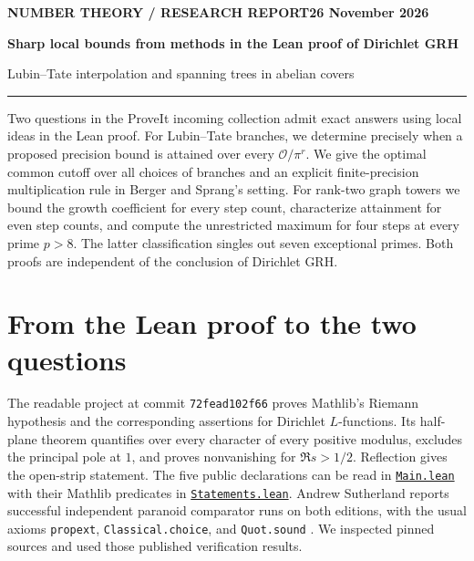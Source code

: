 \documentclass[11pt,letterpaper]{article}
\theoremstyle{definition}\newtheorem{example}[theorem]{Example}
\newcommand{\OO}{\mathcal O}\newcommand{\FF}{\mathbb F}\newcommand{\ZZ}{\mathbb Z}\newcommand{\QQ}{\mathbb Q}
\newcommand{\src}[2]{\href{https://github.com/lsernau/grh-lean/blob/72fead102f663d5c7a407964a13dc0cf9d977207/grh/src/#1}{#2}}
\numberwithin{equation}{section}
\begin{document}
\thispagestyle{plain}
{\small\bfseries\textcolor{accent}{NUMBER THEORY \enspace / \enspace RESEARCH REPORT}\hfill 26 November 2026\par}
\vspace{10pt}
{\LARGE\bfseries\color{inkblue} Sharp local bounds from methods in the Lean proof of Dirichlet GRH\par}
\vspace{4pt}
{\large Lubin--Tate interpolation and spanning trees in abelian covers\par}
\vspace{9pt}\hrule\vspace{10pt}
\noindent Two questions in the ProveIt incoming collection admit exact answers using local ideas in the Lean proof. For Lubin--Tate branches, we determine precisely when a proposed precision bound is attained over every $\OO/\pi^r$. We give the optimal common cutoff over all choices of branches and an explicit finite-precision multiplication rule in Berger and Sprang's setting. For rank-two graph towers we bound the growth coefficient for every step count, characterize attainment for even step counts, and compute the unrestricted maximum for four steps at every prime $p>8$. The latter classification singles out seven exceptional primes. Both proofs are independent of the conclusion of Dirichlet GRH.

\section{From the Lean proof to the two questions}
The readable project at commit \texttt{72fead102f66} proves Mathlib's Riemann hypothesis and the corresponding assertions for Dirichlet $L$-functions. Its half-plane theorem quantifies over every character of every positive modulus, excludes the principal pole at $1$, and proves nonvanishing for $\Re s>1/2$. Reflection gives the open-strip statement. The five public declarations can be read in \src{Main.lean}{\texttt{Main.lean}} with their Mathlib predicates in \src{Statements.lean}{\texttt{Statements.lean}}. Andrew Sutherland reports successful independent paranoid comparator runs on both editions, with the usual axioms \texttt{propext}, \texttt{Classical.choice}, and \texttt{Quot.sound} \cite{repo,sutherland}. We inspected pinned sources and used those published verification results.
\end{document}
